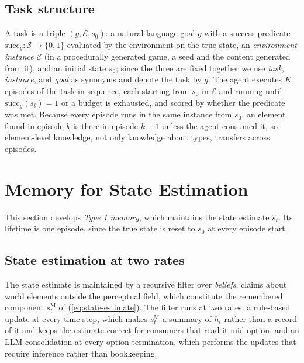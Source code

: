 \documentclass[10pt]{article}
\newcommand{\calS}{\mathcal{S}}
\newcommand{\calE}{\mathcal{E}}
\newcommand{\shat}{\hat{s}}
\newcommand{\sM}{s^{\mathrm{M}}}
\begin{document}
\subsection{Task structure}
\label{sec:tasks}

A task is a triple $(g,\calE,s_0)$: a natural-language goal $g$ with a success predicate $\mathrm{succ}_g:\calS\to\{0,1\}$ evaluated by the environment on the true state, an \emph{environment instance} $\calE$ (in a procedurally generated game, a seed and the content generated from it), and an initial state $s_0$; since the three are fixed together we use \emph{task}, \emph{instance}, and \emph{goal} as synonyms and denote the task by $g$. The agent executes $K$ episodes of the task in sequence, each starting from $s_0$ in $\calE$ and running until $\mathrm{succ}_g(s_t)=1$ or a budget is exhausted, and scored by whether the predicate was met. Because every episode runs in the same instance from $s_0$, an element found in episode $k$ is there in episode $k+1$ unless the agent consumed it, so element-level knowledge, not only knowledge about types, transfers across episodes.

\section{Memory for State Estimation}
\label{sec:type1}

This section develops \emph{Type 1 memory}, which maintains the state estimate $\shat_t$. Its lifetime is one episode, since the true state is reset to $s_0$ at every episode start.

\subsection{State estimation at two rates}
\label{sec:type1-est}

The state estimate is maintained by a recursive filter over \emph{beliefs}, claims about world elements outside the perceptual field, which constitute the remembered component $\sM_t$ of (\ref{eq:state-estimate}). The filter runs at two rates: a rule-based update at every time step, which makes $\sM_t$ a summary of $h_t$ rather than a record of it and keeps the estimate correct for consumers that read it mid-option, and an LLM consolidation at every option termination, which performs the updates that require inference rather than bookkeeping.
\end{document}
